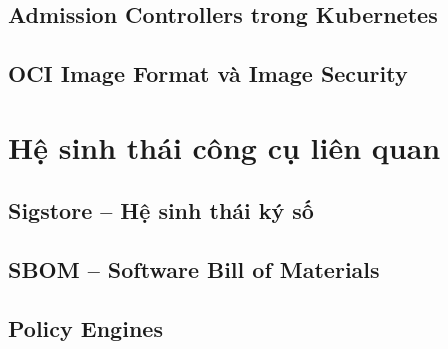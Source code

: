 \subsection{Admission Controllers trong Kubernetes}

\subsection{OCI Image Format và Image Security}

\section{Hệ sinh thái công cụ liên quan}

\subsection{Sigstore -- Hệ sinh thái ký số}

\subsection{SBOM -- Software Bill of Materials}

\subsection{Policy Engines}
